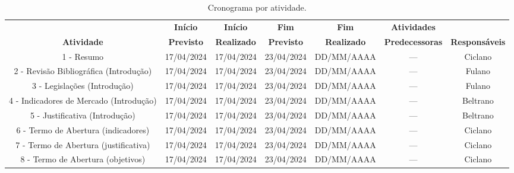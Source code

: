 \begin{landscape}
\begin{table}[htpb]
\begin{center}
\caption{Cronograma por atividade.}
\begin{tabular}{|c|c|c|c|c|c|c|}
\hline
& \textbf{Início} & \textbf{Início} & \textbf{Fim} & \textbf{Fim} & \textbf{Atividades} & \\
\textbf{Atividade} & \textbf{Previsto} & \textbf{Realizado} & \textbf{Previsto} & \textbf{Realizado} & \textbf{Predecessoras} & \textbf{Responsáveis}\\ \hline
1 - Resumo                       & 17/04/2024               & 17/04/2024                & 23/04/2024               & DD/MM/AAAA                & ---                           & Ciclano \\ \hline
2 - Revisão Bibliográfica (Introdução)                       & 17/04/2024               & 17/04/2024                & 23/04/2024               & DD/MM/AAAA                & ---                               & Fulano \\ \hline
3 - Legislações (Introdução)                      & 17/04/2024               & 17/04/2024                & 23/04/2024               & DD/MM/AAAA                & ---                                 & Fulano \\ \hline
4 - Indicadores de Mercado (Introdução)                      & 17/04/2024               & 17/04/2024                & 23/04/2024               & DD/MM/AAAA                & ---                              & Beltrano \\ \hline
5 - Justificativa (Introdução)                      & 17/04/2024               & 17/04/2024                & 23/04/2024               & DD/MM/AAAA                & ---                                 & Beltrano \\ \hline
6 - Termo de Abertura (indicadores)                       & 17/04/2024               & 17/04/2024                & 23/04/2024               & DD/MM/AAAA                & ---                           & Ciclano \\ \hline
7 - Termo de Abertura (justificativa)                       & 17/04/2024               & 17/04/2024                & 23/04/2024               & DD/MM/AAAA                & ---                           & Ciclano \\ \hline
8 - Termo de Abertura (objetivos)                       & 17/04/2024               & 17/04/2024                & 23/04/2024               & DD/MM/AAAA                & ---                           & Ciclano \\ \hline

\end{tabular}
\end{center}
\end{table}
\end{landscape}

